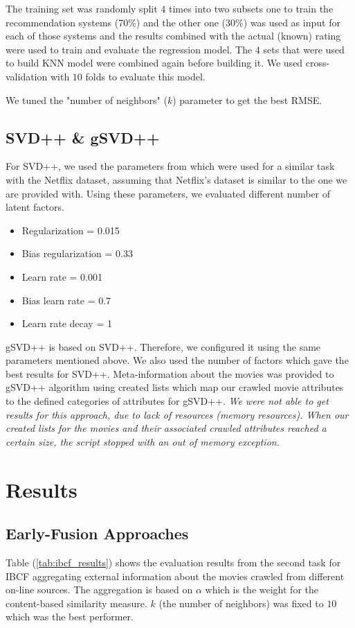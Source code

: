 \documentclass{sigish}
\begin{document}
The training set was randomly split $ 4 $ times into two subsets one to train the recommendation systems (70\%) and the other one (30\%) was used as input for each of those systems and the results combined with the actual (known) rating were used to train and evaluate the regression model.
The $ 4 $ sets that were used to build KNN model were combined again before building it. We used cross-validation with $ 10 $ folds to evaluate this model.

We tuned the "number of neighbors" ($ k $) parameter to get the best RMSE. 

\subsection{SVD++ \& gSVD++}
For SVD++, we used the parameters from \cite{Koren:2009} which were used for a similar task with the Netflix dataset, assuming that Netflix's dataset is similar to the one we are provided with. Using these parameters, we evaluated different number of latent factors.
\begin{itemize}
\item Regularization = 0.015
\item Bias regularization = 0.33
\item Learn rate = 0.001
\item Bias learn rate = 0.7
\item Learn rate decay = 1
\end{itemize}

gSVD++ is based on SVD++. Therefore, we configured it using the same parameters mentioned above. We also used the number of factors which gave the best results for SVD++. Meta-information about the movies was provided to gSVD++ algorithm using created lists which map our crawled movie attributes to the defined categories of attributes for gSVD++.
\emph{We were not able to get results for this approach, due to lack of resources (memory resources). When our created lists for the movies and their associated crawled attributes reached a certain size, the script stopped with an out of memory exception.}

\section{Results}
\label{sec:results}
\subsection{Early-Fusion Approaches}
Table (\ref{tab:ibcf_results}) shows the evaluation results from the second task for IBCF aggregating external information about the movies crawled from different on-line sources. The aggregation is based on $ \alpha $ which is the weight for the content-based similarity measure. $ k $ (the number of neighbors) was fixed to $ 10 $ which was the best performer.
\end{document}

